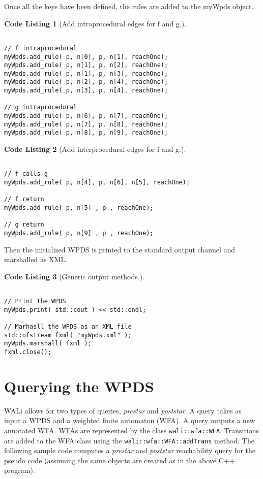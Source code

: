 \documentclass[english,a4paper,11pt]{article}
\theoremstyle{definition}
\newtheorem{codelist}{Code Listing}[section]
\def\WALi{\textsf{WALi}\xspace}
\begin{document}
Once all the keys have been defined, the rules are added to the
myWpds object.
\begin{codelist}[Add intraprocedural edges for f and g.]
\label{Intra}
\begin{lstlisting}

// f intraprocedural
myWpds.add_rule( p, n[0], p, n[1], reachOne);
myWpds.add_rule( p, n[1], p, n[2], reachOne);
myWpds.add_rule( p, n[1], p, n[3], reachOne);
myWpds.add_rule( p, n[2], p, n[4], reachOne);
myWpds.add_rule( p, n[3], p, n[4], reachOne);

// g intraprocedural
myWpds.add_rule( p, n[6], p, n[7], reachOne);
myWpds.add_rule( p, n[7], p, n[8], reachOne);
myWpds.add_rule( p, n[8], p, n[9], reachOne);
\end{lstlisting}
\end{codelist}

\begin{codelist}[Add interprocedural edges for f and g.]
\label{Intrer}
\begin{lstlisting}

// f calls g
myWpds.add_rule( p, n[4], p, n[6], n[5], reachOne);

// f return
myWpds.add_rule( p, n[5] , p , reachOne);

// g return
myWpds.add_rule( p, n[9] , p , reachOne);
\end{lstlisting}
\end{codelist}

Then the initialized WPDS is printed to the standard output
channel and marshalled as XML.
\begin{codelist}[Generic output methods.]
\label{Output}
\begin{lstlisting}

// Print the WPDS
myWpds.print( std::cout ) << std::endl;

// Marhasll the WPDS as an XML file
std::ofstream fxml( "myWpds.xml" );
myWpds.marshall( fxml );
fxml.close();
\end{lstlisting}
\end{codelist}


\section{Querying the WPDS}
\label{Se:Query}

\WALi allows for two types of queries, \emph{prestar} and \emph{poststar}. A
query takes as input a WPDS and a weighted finite automaton (WFA). A query
outputs a new annotated WFA. WFAs are represented by the class
\verb!wali::wfa::WFA!. Transitions are added to the WFA class using the
\verb!wali::wfa::WFA::addTrans! method. The following sample code computes a
\emph{prestar} and \emph{poststar} reachability query for the pseudo code
(assuming the same objects are created as in the above C++ program).
\end{document}
